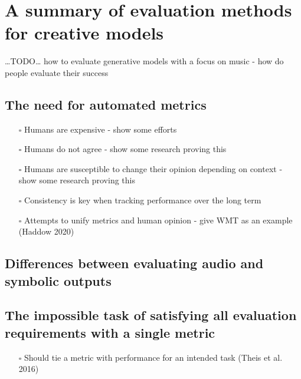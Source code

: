 \documentclass[12pt,a4paper,]{report}
\providecommand{\tightlist}{%
  \setlength{\itemsep}{0pt}\setlength{\parskip}{0pt}}
\begin{document}
\hypertarget{a-summary-of-evaluation-methods-for-creative-models}{%
\section{A summary of evaluation methods for creative
models}\label{a-summary-of-evaluation-methods-for-creative-models}}

\ldots TODO\ldots{} how to evaluate generative models with a focus on
music - how do people evaluate their success

\hypertarget{the-need-for-automated-metrics}{%
\subsection{The need for automated
metrics}\label{the-need-for-automated-metrics}}

\begin{itemize}
\tightlist
\item[$\square$]
  Humans are expensive - show some efforts
\item[$\square$]
  Humans do not agree - show some research proving this
\item[$\square$]
  Humans are susceptible to change their opinion depending on context -
  show some research proving this
\item[$\square$]
  Consistency is key when tracking performance over the long term
\item[$\square$]
  Attempts to unify metrics and human opinion - give WMT as an example
  (Haddow 2020)
\end{itemize}

\hypertarget{differences-between-evaluating-audio-and-symbolic-outputs}{%
\subsection{Differences between evaluating audio and symbolic
outputs}\label{differences-between-evaluating-audio-and-symbolic-outputs}}

\hypertarget{the-impossible-task-of-satisfying-all-evaluation-requirements-with-a-single-metric}{%
\subsection{The impossible task of satisfying all evaluation
requirements with a single
metric}\label{the-impossible-task-of-satisfying-all-evaluation-requirements-with-a-single-metric}}

\begin{itemize}
\tightlist
\item[$\square$]
  Should tie a metric with performance for an intended task (Theis et
  al. 2016)
\end{itemize}
\end{document}
